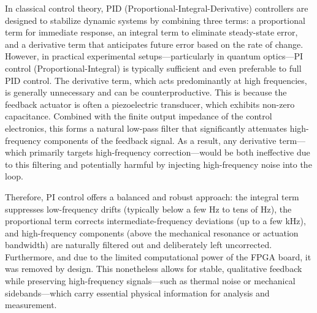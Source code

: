 In classical control theory, PID (Proportional-Integral-Derivative) controllers are designed to stabilize dynamic systems by combining three terms: a proportional term for immediate response, an integral term to eliminate steady-state error, and a derivative term that anticipates future error based on the rate of change. However, in practical experimental setups—particularly in quantum optics—PI control (Proportional-Integral) is typically sufficient and even preferable to full PID control. The derivative term, which acts predominantly at high frequencies, is generally unnecessary and can be counterproductive. This is because the feedback actuator is often a piezoelectric transducer, which exhibits non-zero capacitance. Combined with the finite output impedance of the control electronics, this forms a natural low-pass filter that significantly attenuates high-frequency components of the feedback signal. As a result, any derivative term—which primarily targets high-frequency correction—would be both ineffective due to this filtering and potentially harmful by injecting high-frequency noise into the loop. \newline 

Therefore, PI control offers a balanced and robust approach: the integral term suppresses low-frequency drifts (typically below a few Hz to tens of Hz), the proportional term corrects intermediate-frequency deviations (up to a few kHz), and high-frequency components (above the mechanical resonance or actuation bandwidth) are naturally filtered out and deliberately left uncorrected. Furthermore, and due to the limited computational power of the FPGA board, it was removed by design. This nonetheless allows for stable, qualitative feedback while preserving high-frequency signals—such as thermal noise or mechanical sidebands—which carry essential physical information for analysis and measurement.


